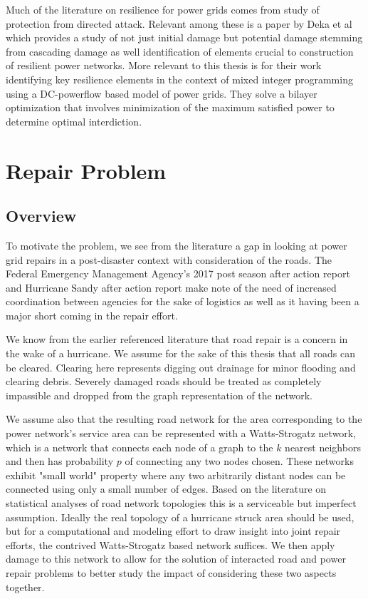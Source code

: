 \documentclass{article}
\begin{document}
		Much of the literature on resilience for power grids comes from study of protection from directed attack. Relevant among these is a paper by Deka et al \cite{Deka2018} which provides a study of not just initial damage but potential damage stemming from cascading damage as well identification of elements crucial to construction of resilient power networks. More relevant to this thesis is \cite{Salmeron2004} for their work identifying key resilience elements in the context of mixed integer programming using a DC-powerflow based model of power grids. They solve a bilayer optimization that involves minimization of the maximum satisfied power to determine optimal interdiction.


	
	\section{Repair Problem}
	
	\subsection{Overview}
	To motivate the problem, we see from the literature a gap in looking at power grid repairs in a post-disaster context with consideration of the roads. The Federal Emergency Management Agency's 2017 post season after action report\cite{FEMA2017AAR}  and Hurricane Sandy after action report \cite{FEMASandyAAR} make note of the need of increased coordination between agencies for the sake of logistics as well as it having been a major short coming in the repair effort.
	
	We know from the earlier referenced literature that road repair is a concern in the wake of a hurricane. We assume for the sake of this thesis that all roads can be cleared. Clearing here represents digging out drainage for minor flooding and clearing debris. Severely damaged roads should be treated as completely impassible and dropped from the graph representation of the network.
	
	We assume also that the resulting road network for the area corresponding to the power network's service area can be represented with a Watts-Strogatz network, which is a network that connects each node of a graph to the $k$ nearest neighbors and then has probability $p$ of connecting any two nodes chosen. These networks exhibit "small world" property where any two arbitrarily distant nodes can be connected using only a small number of edges. Based on the literature on statistical analyses of road network topologies \cite{LammerEA2006} \cite{ChanEA2011} this is a serviceable but imperfect assumption. Ideally the real topology of a hurricane struck area should be used, but for a computational and modeling effort to draw insight into joint repair efforts, the contrived Watts-Strogatz based network suffices. We then apply damage to this network to allow for the solution of interacted road and power repair problems to better study the impact of considering these two aspects together.
		
\end{document}
